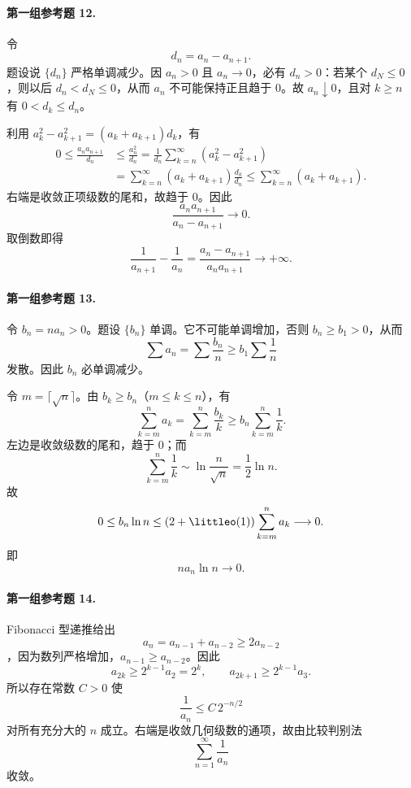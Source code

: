 \paragraph{第一组参考题 12.}
\begin{xsolution}
令
\[
 d_n=a_n-a_{n+1}.
\]
题设说 $\{d_n\}$ 严格单调减少。因 $a_n>0$ 且 $a_n\to0$，必有 $d_n>0$：若某个 $d_N\leq0$，则以后 $d_n<d_N\leq0$，从而 $a_n$ 不可能保持正且趋于 $0$。故 $a_n\downarrow0$，且对 $k\geq n$ 有 $0<d_k\leq d_n$。

利用 $a_k^2-a_{k+1}^2=(a_k+a_{k+1})d_k$，有
\[
 \begin{aligned}
 0\leq\frac{a_na_{n+1}}{d_n}
 &\leq\frac{a_n^2}{d_n}
 =\frac1{d_n}\sum_{k=n}^{\infty}(a_k^2-a_{k+1}^2)\\
 &=\sum_{k=n}^{\infty}(a_k+a_{k+1})\frac{d_k}{d_n}
 \leq\sum_{k=n}^{\infty}(a_k+a_{k+1}).
 \end{aligned}
\]
右端是收敛正项级数的尾和，故趋于 $0$。因此
\[
 \frac{a_na_{n+1}}{a_n-a_{n+1}}\longrightarrow0.
\]
取倒数即得
\[
 \boxed{\frac1{a_{n+1}}-\frac1{a_n}
 =\frac{a_n-a_{n+1}}{a_na_{n+1}}\longrightarrow+\infty}.
\]
\end{xsolution}

\paragraph{第一组参考题 13.}
\begin{xsolution}
令 $b_n=na_n>0$。题设 $\{b_n\}$ 单调。它不可能单调增加，否则 $b_n\geq b_1>0$，从而
\[
 \sum a_n=\sum\frac{b_n}{n}\geq b_1\sum\frac1n
\]
发散。因此 $b_n$ 必单调减少。

令 $m=\lceil\sqrt n\rceil$。由 $b_k\geq b_n$（$m\leq k\leq n$），有
\[
 \sum_{k=m}^{n}a_k
 =\sum_{k=m}^{n}\frac{b_k}{k}
 \geq b_n\sum_{k=m}^{n}\frac1k.
\]
左边是收敛级数的尾和，趋于 $0$；而
\[
 \sum_{k=m}^{n}\frac1k\sim\ln\frac n{\sqrt n}=\frac12\ln n.
\]
故
\[
 0\leq b_n\ln n
 \leq(2+\littleo(1))\sum_{k=m}^{n}a_k\longrightarrow0.
\]
即
\[
 \boxed{na_n\ln n\to0.}
\]
\end{xsolution}

\paragraph{第一组参考题 14.}
\begin{xsolution}
Fibonacci 型递推给出
\[
 a_n=a_{n-1}+a_{n-2}\geq2a_{n-2}
\]
，因为数列严格增加，$a_{n-1}\geq a_{n-2}$。因此
\[
 a_{2k}\geq2^{k-1}a_2=2^k,
 \qquad
 a_{2k+1}\geq2^{k-1}a_3.
\]
所以存在常数 $C>0$ 使
\[
 \frac1{a_n}\leq C\,2^{-n/2}
\]
对所有充分大的 $n$ 成立。右端是收敛几何级数的通项，故由比较判别法
\[
 \sum_{n=1}^{\infty}\frac1{a_n}
\]
收敛。
\end{xsolution}

